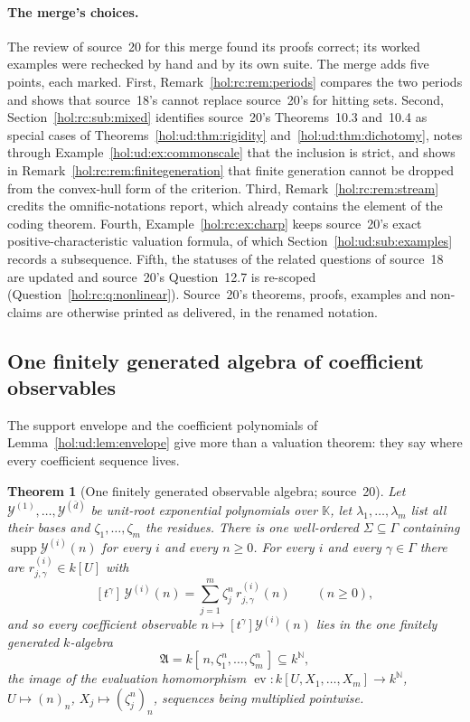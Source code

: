 \documentclass[11pt]{article}
\numberwithin{equation}{section}
\newtheorem{theorem}{Theorem}[section]
\theoremstyle{definition}
\theoremstyle{remark}
\newcommand{\N}{\mathbb N}
\newcommand{\supp}{\operatorname{supp}}
\newcommand{\KK}{\mathbb K}
\begin{document}
\paragraph{The merge's choices.}
The review of source~20 for this merge found its proofs correct; its worked
examples were rechecked by hand and by its own suite. The merge adds five
points, each marked. First, Remark~\ref{hol:rc:rem:periods} compares the two
periods and shows that source~18's cannot replace source~20's for hitting
sets. Second, Section~\ref{hol:rc:sub:mixed} identifies source~20's
Theorems~10.3 and~10.4 as special cases of
Theorems~\ref{hol:ud:thm:rigidity} and~\ref{hol:ud:thm:dichotomy}, notes
through Example~\ref{hol:ud:ex:commonscale} that the inclusion is strict, and
shows in Remark~\ref{hol:rc:rem:finitegeneration} that finite generation cannot
be dropped from the convex-hull form of the criterion. Third,
Remark~\ref{hol:rc:rem:stream} credits the omnific-notations report, which
already contains the element of the coding theorem. Fourth,
Example~\ref{hol:rc:ex:charp} keeps source~20's exact positive-characteristic
valuation formula, of which Section~\ref{hol:ud:sub:examples} records a
subsequence. Fifth, the statuses of the related questions of source~18 are
updated and source~20's Question~12.7 is re-scoped
(Question~\ref{hol:rc:q:nonlinear}). Source~20's theorems, proofs, examples
and non-claims are otherwise printed as delivered, in the renamed notation.

\subsection{One finitely generated algebra of coefficient observables}
\label{hol:rc:sub:algebra}

The support envelope and the coefficient polynomials of
Lemma~\ref{hol:ud:lem:envelope} give more than a valuation theorem: they say
where every coefficient sequence lives.

\begin{theorem}[One finitely generated observable algebra; source~20]
\label{hol:rc:thm:algebra}
Let $\mathcal Y^{(1)},\ldots,\mathcal Y^{(\bar d)}$ be unit-root exponential
polynomials over $\KK$, let $\lambda_1,\ldots,\lambda_m$ list all their bases
and $\zeta_1,\ldots,\zeta_m$ the residues. There is one well-ordered
$\Sigma\subseteq\Gamma$ containing $\supp\mathcal Y^{(i)}(n)$ for every $i$
and every $n\ge0$. For every $i$ and every $\gamma\in\Gamma$ there are
$r^{(i)}_{j,\gamma}\in k[U]$ with
\begin{equation}\label{hol:rc:eq:coefficient}
 [t^\gamma]\,\mathcal Y^{(i)}(n)=\sum_{j=1}^m\zeta_j^n\,r^{(i)}_{j,\gamma}(n)
 \qquad(n\ge0),
\end{equation}
and so every coefficient observable $n\mapsto[t^\gamma]\mathcal Y^{(i)}(n)$
lies in the one finitely generated $k$-algebra
\begin{equation}\label{hol:rc:eq:algebra}
 \mathfrak A=k[\,n,\zeta_1^n,\ldots,\zeta_m^n\,]\subseteq k^{\N},
\end{equation}
the image of the evaluation homomorphism
$\operatorname{ev}:k[U,X_1,\ldots,X_m]\to k^{\N}$, $U\mapsto(n)_n$,
$X_j\mapsto(\zeta_j^n)_n$, sequences being multiplied pointwise.
\end{theorem}
\end{document}
